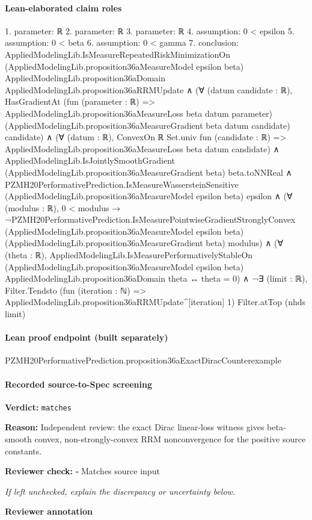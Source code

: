 \documentclass[10pt]{article}
\newcommand{\reviewerbox}{%
  \par\noindent\fbox{\parbox{0.96\linewidth}{\rule{0pt}{0.38in}}}\par
}
\newcommand{\reviewmatch}[1]{%
  \par\noindent\textbf{Reviewer check:} $\square$\; #1\par
  \noindent\emph{If left unchecked, explain the discrepancy or uncertainty below.}\par
}
\begin{document}
\paragraph{Lean-elaborated claim roles}\begin{ReviewVerbatim}
1. parameter: ℝ
2. parameter: ℝ
3. parameter: ℝ
4. assumption: 0 < epsilon
5. assumption: 0 < beta
6. assumption: 0 < gamma
7. conclusion: AppliedModelingLib.IsMeasureRepeatedRiskMinimizationOn (AppliedModelingLib.proposition36aMeasureModel epsilon beta)
    AppliedModelingLib.proposition36aDomain AppliedModelingLib.proposition36aRRMUpdate ∧
  (∀ (datum candidate : ℝ),
      HasGradientAt (fun (parameter : ℝ) => AppliedModelingLib.proposition36aMeasureLoss beta datum parameter)
        (AppliedModelingLib.proposition36aMeasureGradient beta datum candidate) candidate) ∧
    (∀ (datum : ℝ),
        ConvexOn ℝ Set.univ fun (candidate : ℝ) => AppliedModelingLib.proposition36aMeasureLoss beta datum candidate) ∧
      AppliedModelingLib.IsJointlySmoothGradient (AppliedModelingLib.proposition36aMeasureGradient beta) beta.toNNReal ∧
        PZMH20PerformativePrediction.IsMeasureWassersteinSensitive
            (AppliedModelingLib.proposition36aMeasureModel epsilon beta) epsilon ∧
          (∀ (modulus : ℝ),
              0 < modulus →
                ¬PZMH20PerformativePrediction.IsMeasurePointwiseGradientStronglyConvex
                    (AppliedModelingLib.proposition36aMeasureModel epsilon beta)
                    (AppliedModelingLib.proposition36aMeasureGradient beta) modulus) ∧
            (∀ (theta : ℝ),
                AppliedModelingLib.IsMeasurePerformativelyStableOn
                    (AppliedModelingLib.proposition36aMeasureModel epsilon beta) AppliedModelingLib.proposition36aDomain
                    theta ↔
                  theta = 0) ∧
              ¬∃ (limit : ℝ),
                  Filter.Tendsto (fun (iteration : ℕ) => AppliedModelingLib.proposition36aRRMUpdate^[iteration] 1)
                    Filter.atTop (nhds limit)
\end{ReviewVerbatim}

\paragraph{Lean proof endpoint (built separately)}\begin{ReviewVerbatim}
PZMH20PerformativePrediction.proposition36aExactDiracCounterexample
\end{ReviewVerbatim}

\paragraph{Recorded source-to-Spec screening}
\textbf{Verdict:} \texttt{matches}
\\
{\raggedright
\textbf{Reason:} Independent review:\allowbreak{} the exact Dirac linear-\allowbreak{}loss witness gives beta-\allowbreak{}smooth convex, non-\allowbreak{}strongly-\allowbreak{}convex RRM nonconvergence for the positive source constants.\allowbreak{}
\par}
\reviewmatch{Matches source input}
\noindent\textbf{Reviewer annotation}\par
\reviewerbox
\clearpage
\hypertarget{source-claim-c4686335fcfce867}{}
\end{document}
